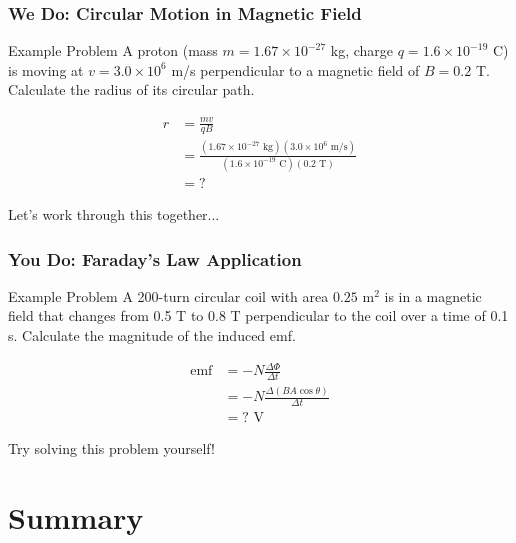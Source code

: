 \documentclass{beamer}
\begin{document}
\begin{frame}
\frametitle{We Do: Circular Motion in Magnetic Field}
\begin{block}{Example Problem}
A proton (mass $m = 1.67 \times 10^{-27}$ kg, charge $q = 1.6 \times 10^{-19}$ C) is moving at $v = 3.0 \times 10^6$ m/s perpendicular to a magnetic field of $B = 0.2$ T. Calculate the radius of its circular path.
\end{block}

\begin{align}
r &= \frac{mv}{qB} \\
&= \frac{(1.67 \times 10^{-27} \text{ kg})(3.0 \times 10^6 \text{ m/s})}{(1.6 \times 10^{-19} \text{ C})(0.2 \text{ T})} \\
&= ?
\end{align}

Let's work through this together...
\end{frame}

\begin{frame}
\frametitle{You Do: Faraday's Law Application}
\begin{block}{Example Problem}
A 200-turn circular coil with area $0.25 \text{ m}^2$ is in a magnetic field that changes from 0.5 T to 0.8 T perpendicular to the coil over a time of 0.1 s. Calculate the magnitude of the induced emf.
\end{block}

\begin{align}
\text{emf} &= -N\frac{\Delta\Phi}{\Delta t} \\
&= -N\frac{\Delta(BA\cos\theta)}{\Delta t} \\
&= ? \text{ V}
\end{align}

Try solving this problem yourself!
\end{frame}

\section{Summary}
\end{document}
